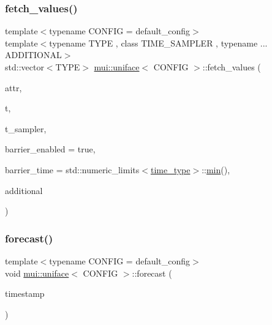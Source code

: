 \subsubsection{\texorpdfstring{fetch\+\_\+values()}{fetch\_values()}}
{\footnotesize\ttfamily template$<$typename C\+O\+N\+F\+IG  = default\+\_\+config$>$ \\
template$<$typename T\+Y\+PE , class T\+I\+M\+E\+\_\+\+S\+A\+M\+P\+L\+ER , typename ... A\+D\+D\+I\+T\+I\+O\+N\+AL$>$ \\
std\+::vector$<$T\+Y\+PE$>$ \hyperlink{classmui_1_1uniface}{mui\+::uniface}$<$ C\+O\+N\+F\+IG $>$\+::fetch\+\_\+values (\begin{DoxyParamCaption}\item[{const std\+::string \&}]{attr,  }\item[{const \hyperlink{classmui_1_1uniface_a65cbecf1936d7d61cb45f14b1138dc07}{time\+\_\+type}}]{t,  }\item[{const T\+I\+M\+E\+\_\+\+S\+A\+M\+P\+L\+ER \&}]{t\+\_\+sampler,  }\item[{bool}]{barrier\+\_\+enabled = {\ttfamily true},  }\item[{\hyperlink{classmui_1_1uniface_a65cbecf1936d7d61cb45f14b1138dc07}{time\+\_\+type}}]{barrier\+\_\+time = {\ttfamily std\+:\+:numeric\+\_\+limits$<$\hyperlink{classmui_1_1uniface_a65cbecf1936d7d61cb45f14b1138dc07}{time\+\_\+type}$>$\+:\+:\hyperlink{namespacemui_afabb57f76b23f5a3542a0510943e69e0}{min}()},  }\item[{A\+D\+D\+I\+T\+I\+O\+N\+AL \&\&...}]{additional }\end{DoxyParamCaption})\hspace{0.3cm}{\ttfamily [inline]}}

\mbox{\label{classmui_1_1uniface_a24cd0f0b799176426481102a53ef25d5}} 
\subsubsection{\texorpdfstring{forecast()}{forecast()}}
{\footnotesize\ttfamily template$<$typename C\+O\+N\+F\+IG  = default\+\_\+config$>$ \\
void \hyperlink{classmui_1_1uniface}{mui\+::uniface}$<$ C\+O\+N\+F\+IG $>$\+::forecast (\begin{DoxyParamCaption}\item[{\hyperlink{classmui_1_1uniface_a65cbecf1936d7d61cb45f14b1138dc07}{time\+\_\+type}}]{timestamp }\end{DoxyParamCaption})\hspace{0.3cm}{\ttfamily [inline]}}

